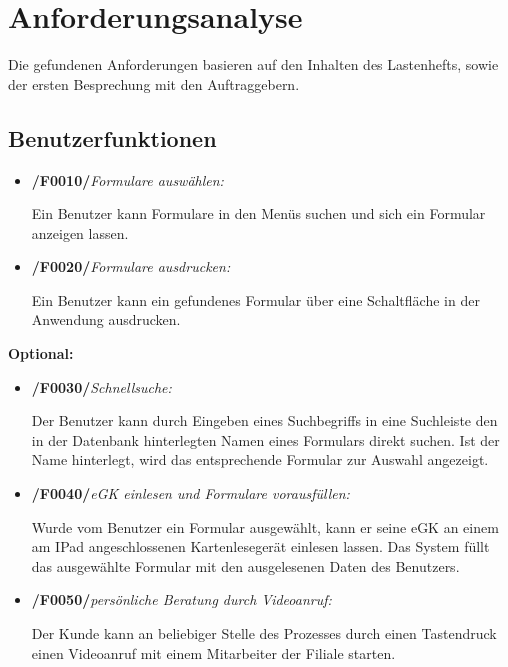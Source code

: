 \section{Anforderungsanalyse}
\vspace{0,5cm}

Die gefundenen Anforderungen basieren auf den Inhalten des Lastenhefts, sowie der ersten Besprechung mit den Auftraggebern.


\subsection{Benutzerfunktionen}

\begin{itemize}
    \item \textbf{/F0010/}\textit{Formulare auswählen:} \par
    Ein Benutzer kann Formulare in den Menüs suchen und sich ein Formular anzeigen lassen.
    \item \textbf{/F0020/}\textit{Formulare ausdrucken:} \par
    Ein Benutzer kann ein gefundenes Formular über eine Schaltfläche in der Anwendung ausdrucken.
\end{itemize}
\vspace{1,5cm}
\textbf{Optional:}
    \begin{itemize}
        \item \textbf{/F0030/}\textit{Schnellsuche:} \par
        Der Benutzer kann durch Eingeben eines Suchbegriffs in eine Suchleiste den in der Datenbank hinterlegten Namen eines Formulars direkt suchen. Ist der Name hinterlegt, wird das entsprechende Formular zur Auswahl angezeigt.
        \item \textbf{/F0040/}\textit{eGK einlesen und Formulare vorausfüllen:} \par
        Wurde vom Benutzer ein Formular ausgewählt, kann er seine eGK an einem am IPad angeschlossenen Kartenlesegerät einlesen lassen. Das System füllt das ausgewählte Formular mit den ausgelesenen Daten des Benutzers.
        \item \textbf{/F0050/}\textit{persönliche Beratung durch Videoanruf:} \par
        Der Kunde kann an beliebiger Stelle des Prozesses durch einen Tastendruck einen Videoanruf mit einem Mitarbeiter der Filiale starten.
    \end{itemize}
    
\newpage

